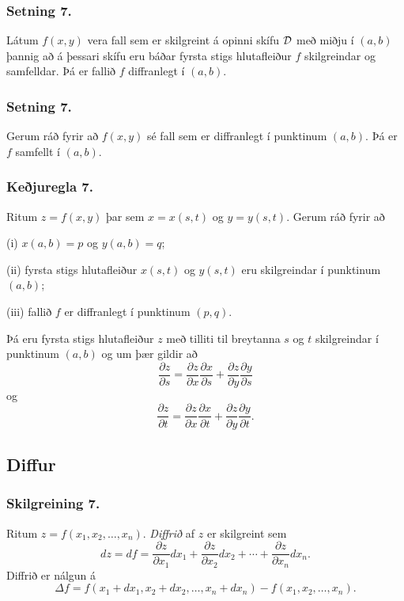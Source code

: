 \subsubsection{Setning 7.}
  Látum  $f(x,y)$ vera fall
sem er skilgreint á opinni 
skífu $\cal D$ með miðju í $(a,b)$ þannig að á þessari skífu eru báðar
fyrsta stigs hlutafleiður $f$ skilgreindar og samfelldar. 
Þá er fallið $f$ diffranlegt í $(a,b)$.




\subsubsection{Setning 7.}
  Gerum ráð fyrir að $f(x,y)$ sé fall sem er
diffranlegt í punktinum $(a,b)$.  Þá er $f$ samfellt í $(a,b)$.




\subsubsection{Keðjuregla 7.}
 Ritum $z=f(x,y)$ þar sem $x=x(s,t)$ og
$y=y(s,t)$.  Gerum ráð fyrir að 

(i) $x(a,b)=p$ og $y(a,b)=q$;

(ii) fyrsta stigs hlutafleiður $x(s,t)$ og $y(s,t)$ eru skilgreindar í
punktinum $(a,b)$;

(iii)  fallið $f$ er diffranlegt í punktinum $(p,q)$.

Þá eru fyrsta stigs hlutafleiður $z$ með tilliti til breytanna $s$ og
$t$ skilgreindar í punktinum $(a,b)$ og um þær gildir að 
$$\frac{\partial z}{\partial s}=
\frac{\partial z}{\partial x}\frac{\partial x}{\partial s}
+\frac{\partial z}{\partial y}\frac{\partial y}{\partial s}$$
og
$$\frac{\partial z}{\partial t}=
\frac{\partial z}{\partial x}\frac{\partial x}{\partial t}
+\frac{\partial z}{\partial y}\frac{\partial y}{\partial t}.$$




\subsection{Diffur} 

\subsubsection{Skilgreining 7.}
  Ritum $z=f(x_1, x_2, \ldots, x_n)$.  {\em
  Diffrið} af $z$ er skilgreint sem 
$$dz=df=\frac{\partial z}{\partial x_1}dx_1
+\frac{\partial z}{\partial x_2}dx_2
+\cdots+\frac{\partial z}{\partial x_n}dx_n.$$
Diffrið er nálgun á 
$$\Delta f=f(x_1+dx_1, x_2+dx_2,\ldots,
x_n+dx_n)-f(x_1,x_2,\ldots,x_n).$$




